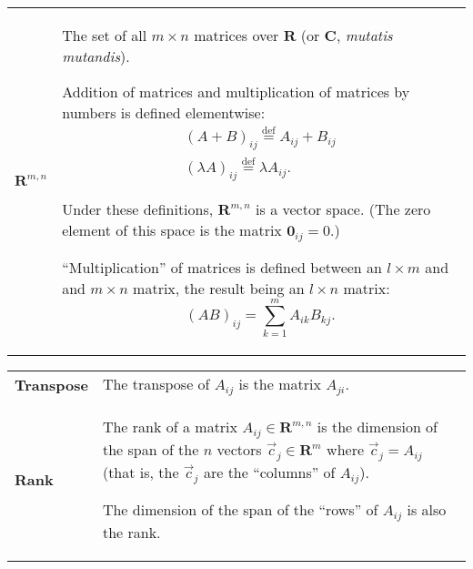 \documentclass[10pt, a4paper, landscape]{article}
\newcommand{\defn}[1]{\textbf{#1}}
\newcommand{\isdef}{\stackrel{\text{def}}{=}}
\newcommand{\set}[1]{\mathbold{#1}}
\begin{document}
\begin{multicols*}{3}
\begin{tabularx}{\columnwidth}{@{}l>{\raggedright\arraybackslash}X@{}}
  $\set{R}^{m,n}$ & The set of all $m\times n$ matrices over $\set{R}$ (or $\set{C}$, \emph{mutatis mutandis}).

  Addition of matrices and multiplication of matrices by numbers is
  defined elementwise:
  \begin{equation*}
    \begin{gathered}
      (A+B)_{ij} \isdef A_{ij} + B_{ij} \\
      (\lambda A)_{ij} \isdef \lambda A_{ij}.
    \end{gathered}
  \end{equation*}

  Under these definitions, $\set{R}^{m,n}$ is a vector space. (The zero element of this space is the matrix $\mathbold{0}_{ij} = 0$.)
  
  “Multiplication” of matrices is defined between an $l\times m$ and and $m \times n$ matrix, the result being an $l\times n$ matrix:
  \begin{equation*}
    (AB)_{ij} = \sum_{k=1}^m A_{ik}B_{kj}.
  \end{equation*}
  \\
\end{tabularx}

\begin{tabularx}{\columnwidth}{@{}l>{\raggedright\arraybackslash}X@{}}

  \defn{Transpose} & The transpose of $A_{ij}$ is the matrix $A_{ji}$.
  \\

  \defn{Rank} & The rank of a matrix $A_{ij}\in\set{R}^{m,n}$ is the dimension of the span of the $n$ vectors $\vec{c}_j\in \set{R}^m$ where $\vec{c}_j = A_{ij}$ (that is, the $\vec{c}_j$ are the ``columns'' of $A_{ij}$).

  The dimension of the span of the ``rows'' of $A_{ij}$ is also the rank.
 
\end{tabularx}

\end{multicols*}
\end{document}

